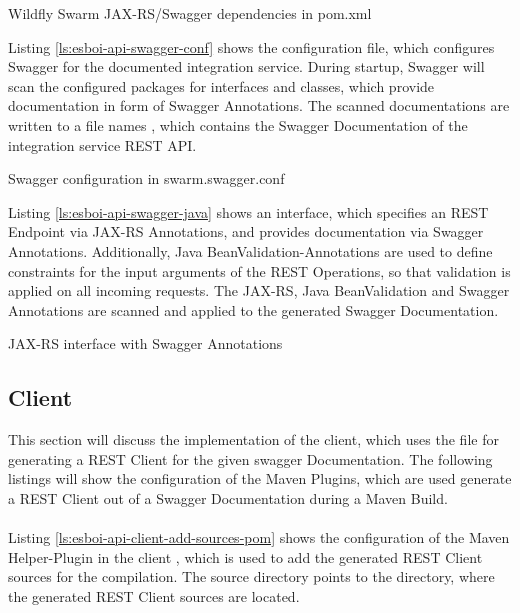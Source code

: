 \begin{listing}[h]
	\caption{Wildfly Swarm JAX-RS/Swagger dependencies in pom.xml}
	\label{ls:esboi-api-service-pom}
\end{listing}

Listing \vref{ls:esboi-api-swagger-conf} shows the  configuration file, which configures Swagger for the documented integration service. During startup, Swagger will scan the configured packages for interfaces and classes, which provide documentation in form of Swagger Annotations. The scanned documentations are written to a file names , which contains the Swagger Documentation of the integration service REST API.    

\begin{listing}[h]
	\caption{Swagger configuration in swarm.swagger.conf}
	\label{ls:esboi-api-swagger-conf}
\end{listing}

Listing \vref{ls:esboi-api-swagger-java} shows an interface, which specifies an REST Endpoint via JAX-RS Annotations, and provides documentation via Swagger Annotations. Additionally, Java BeanValidation-Annotations are used to define constraints for the input arguments of the REST Operations, so that validation is applied on all incoming requests. The JAX-RS, Java BeanValidation and Swagger Annotations are scanned and applied to the generated Swagger Documentation.

\begin{listing}[h]
	\caption{JAX-RS interface with Swagger Annotations}
	\label{ls:esboi-api-swagger-java}
\end{listing}

\subsection{Client}
\label{sec:esbi-api-client}
This section will discuss the implementation of the client, which uses the  file for generating a REST Client for the given swagger Documentation. The following listings will show the configuration of the Maven Plugins, which are used generate a REST Client out of a Swagger Documentation during a Maven Build.
\\ \\
Listing \vref{ls:esboi-api-client-add-sources-pom} shows the configuration of the Maven Helper-Plugin in the client  , which is used to add the generated REST Client sources for the compilation. The source directory points to the directory, where the generated REST Client sources are located.
\newpage 

